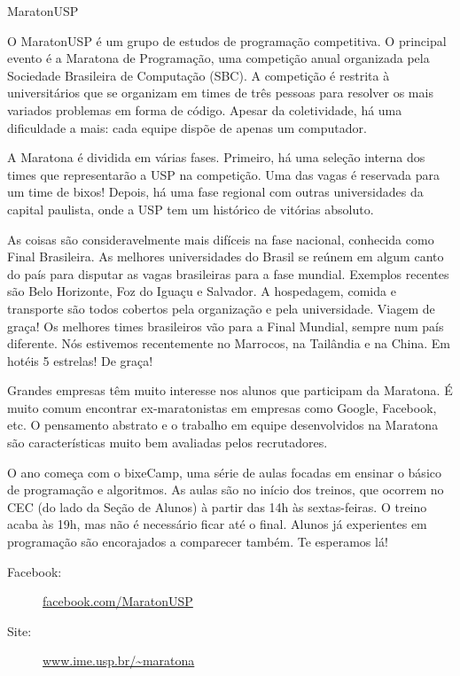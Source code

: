 \begin{subsecao}{MaratonUSP}


O MaratonUSP é um grupo de estudos de programação competitiva. O principal evento é a Maratona de Programação, uma competição anual organizada pela Sociedade Brasileira de Computação (SBC). A competição é restrita à universitários que se organizam em times de três pessoas para resolver os mais variados problemas em forma de código. Apesar da coletividade, há uma dificuldade a mais: cada equipe dispõe de apenas um computador.

A Maratona é dividida em várias fases. Primeiro, há uma seleção interna dos times que representarão a USP na competição. Uma das vagas é reservada para um time de bixos! Depois, há uma fase regional com outras universidades da capital paulista, onde a USP tem um histórico de vitórias absoluto.

As coisas são consideravelmente mais difíceis na fase nacional, conhecida como Final Brasileira. As melhores universidades do Brasil se reúnem em algum canto do país para disputar as vagas brasileiras para a fase mundial. Exemplos recentes são Belo Horizonte, Foz do Iguaçu e Salvador. A hospedagem, comida e transporte são todos cobertos pela organização e pela universidade. Viagem de graça! Os melhores times brasileiros vão para a Final Mundial, sempre num país diferente. Nós estivemos recentemente no Marrocos, na Tailândia e na China. Em hotéis 5 estrelas! De graça!

Grandes empresas têm muito interesse nos alunos que participam da Maratona. É muito comum encontrar ex-maratonistas em empresas como Google, Facebook, etc. O pensamento abstrato e o trabalho em equipe desenvolvidos na Maratona são características muito bem avaliadas pelos recrutadores.

O ano começa com o bixeCamp, uma série de aulas focadas em ensinar o básico de programação e algoritmos. As aulas são no início dos treinos, que ocorrem no CEC (do lado da Seção de Alunos) à partir das 14h às sextas-feiras. O treino acaba às 19h, mas não é necessário ficar até o final. Alunos já experientes em programação são encorajados a comparecer também. Te esperamos lá!

\begin{description}
\item [Facebook:] \url{facebook.com/MaratonUSP}
\item[Site:] \url{www.ime.usp.br/~maratona}
\end{description}

\end{subsecao}
